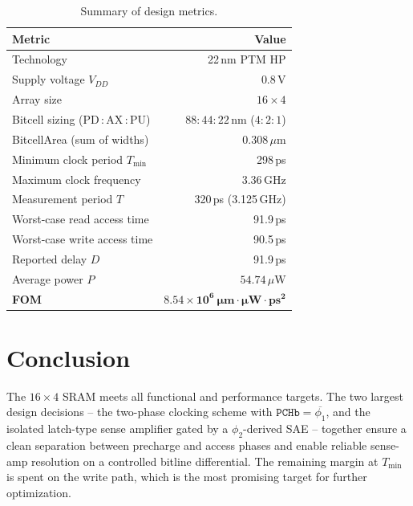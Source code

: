 \documentclass[11pt,letterpaper]{article}
\newcommand{\Vdd}{\ensuremath{V_{DD}}}
\newcommand{\um}{\ensuremath{\,\mu\text{m}}}
\newcommand{\uW}{\ensuremath{\,\mu\text{W}}}
\begin{document}
\begin{table}[H]
  \centering
  \caption{Summary of design metrics.}
  \label{tab:summary}
  \begin{tabular}{@{}lr@{}}
    \toprule
    Metric & Value \\
    \midrule
    Technology                        & 22\,nm PTM HP \\
    Supply voltage $\Vdd$             & 0.8\,V \\
    Array size                        & $16\times4$ \\
    Bitcell sizing (PD\,:\,AX\,:\,PU) & $88:44:22$\,nm ($4:2:1$) \\
    BitcellArea (sum of widths)       & $0.308\um$ \\
    Minimum clock period $T_{\min}$   & 298\,ps \\
    Maximum clock frequency           & 3.36\,GHz \\
    Measurement period $T$            & 320\,ps (3.125\,GHz) \\
    Worst-case read access time       & 91.9\,ps \\
    Worst-case write access time      & 90.5\,ps \\
    Reported delay $D$                & 91.9\,ps \\
    Average power $P$                 & $54.74\uW$ \\
    \textbf{FOM}                      & $\mathbf{8.54\times10^{6}\ \mu\text{m}\cdot\mu\text{W}\cdot\text{ps}^{2}}$ \\
    \bottomrule
  \end{tabular}
\end{table}

\section{Conclusion}

The $16\times4$ SRAM meets all functional and performance targets. The two
largest design decisions -- the two-phase clocking scheme with
$\texttt{PCHb}=\overline{\phi_1}$, and the isolated latch-type sense
amplifier gated by a $\phi_2$-derived SAE -- together ensure a clean
separation between precharge and access phases and enable reliable
sense-amp resolution on a controlled bitline differential. The remaining
margin at $T_{\min}$ is spent on the write path, which is the most
promising target for further optimization.
\end{document}
